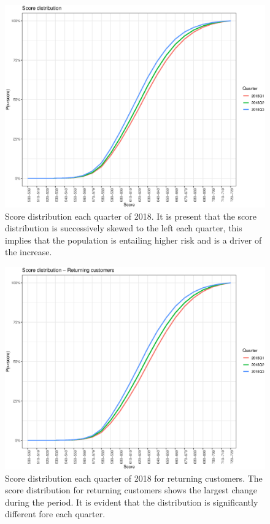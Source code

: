 
\begin{figure}[!ht]
  \centering
  \includegraphics[width=5in,trim={0 0 0 0},clip]{content/figures/score_dev_nl.eps} 
  \caption{Score distribution each quarter of 2018. It is present that the score distribution is successively skewed to the left each quarter, this implies that the population is entailing higher risk and is a driver of the increase.}
  \label{fig:score_dev_1}
\end{figure}

\begin{figure}[!ht]
  \centering
  \includegraphics[width=5in,trim={0 0 0 0},clip]{content/figures/score_dev_nl_ret.eps} 
  \caption{Score distribution each quarter of 2018 for returning customers. The score distribution for returning customers shows the largest change during the period. It is evident that the distribution is significantly different fore each quarter.}
  \label{fig:score_dev_ret}
\end{figure}

